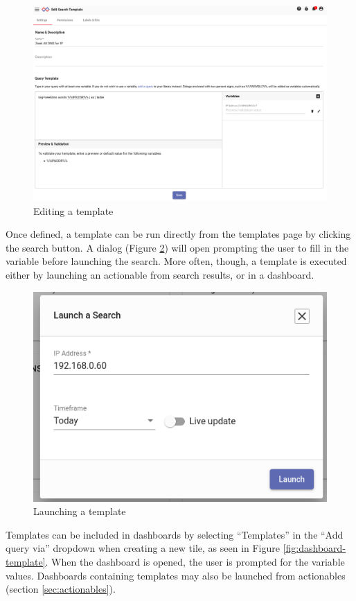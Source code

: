 \begin{figure}[H]
	\includegraphics[width=0.9\linewidth]{images/template-editor.png}
	\caption{Editing a template}
	\label{fig:template-editor}
\end{figure}

Once defined, a template can be run directly from the templates page by clicking the search button. A dialog (Figure \ref{fig:template-prompt}) will open prompting the user to fill in the variable before launching the search. More often, though, a template is executed either by launching an actionable from search results, or in a dashboard.

\begin{figure}[H]
	\includegraphics[width=0.6\linewidth]{images/template-prompt.png}
	\caption{Launching a template}
	\label{fig:template-prompt}
\end{figure}

Templates can be included in dashboards by selecting ``Templates'' in the ``Add query via'' dropdown when creating a new tile, as seen in Figure \ref{fig:dashboard-template}. When the dashboard is opened, the user is prompted for the variable values. Dashboards containing templates may also be launched from actionables (section \ref{sec:actionables}).

